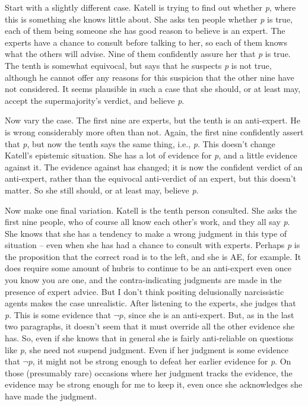 Start with a slightly different case. \gls{Katell} is trying to find out whether \emph{p}, where this is something she knows little about. She asks ten people whether \emph{p} is true, each of them being someone she has good reason to believe is an expert. The experts have a chance to consult before talking to her, so each of them knows what the others will advise. Nine of them confidently assure her that \emph{p} is true. The tenth is somewhat equivocal, but says that he suspects \emph{p} is not true, although he cannot offer any reasons for this suspicion that the other nine have not considered. It seems plausible in such a case that she should, or at least may, accept the supermajority's verdict, and believe \emph{p}.

Now vary the case. The first nine are experts, but the tenth is an anti-expert. He is wrong considerably more often than not. Again, the first nine confidently assert that \emph{p}, but now the tenth says the same thing, i.e., \emph{p}. This doesn't change \gls{Katell}'s epistemic situation. She has a lot of evidence for \emph{p}, and a little evidence against it. The evidence against has changed; it is now the confident verdict of an anti-expert, rather than the equivocal anti-verdict of an expert, but this doesn't matter. So she still should, or at least may, believe \emph{p}.

Now make one final variation. \gls{Katell} is the tenth person consulted. She asks the first nine people, who of course all know each other's work, and they all say \emph{p}. She knows that she has a tendency to make a wrong judgment in this type of situation -- even when she has had a chance to consult with experts. Perhaps \emph{p} is the proposition that the correct road is to the left, and she is \gls{AE}, for example. It does require some amount of hubris to continue to be an anti-expert even once you know you are one, and the contra-indicating judgments are made in the presence of expert advice. But I don't think positing delusionally narcissistic agents makes the case unrealistic. After listening to the experts, she judges that \emph{p}. This is some evidence that $\neg p$, since she is an anti-expert. But, as in the last two paragraphs, it doesn't seem that it must override all the other evidence she has. So, even if she knows that in general she is fairly anti-reliable on questions like \emph{p}, she need not suspend judgment. Even if her judgment is some evidence that $\neg p$, it might not be strong enough to defeat her earlier evidence for \emph{p}. On those (presumably rare) occasions where her judgment tracks the evidence, the evidence may be strong enough for me to keep it, even once she acknowledges she have made the judgment.


